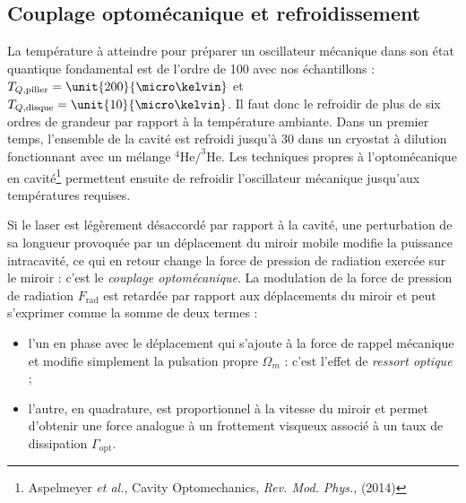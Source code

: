 \documentclass[12pt,a4paper]{article}
\begin{document}
\subsection{Couplage optomécanique et refroidissement}
\label{sec:optomechanics}

La température à atteindre pour préparer un oscillateur mécanique dans son état quantique fondamental est de l'ordre de \unit{100}{\micro\kelvin} avec nos échantillons : $T_{Q,\mathrm{pilier}} = \unit{200}{\micro\kelvin}$ et $T_{Q,\mathrm{disque}} = \unit{10}{\micro\kelvin}$.
Il faut donc le refroidir de plus de six ordres de grandeur par rapport à la température ambiante.
Dans un premier temps, l'ensemble de la cavité est refroidi jusqu'à \unit{30}{\milli\kelvin} dans un cryostat à dilution fonctionnant avec un mélange $\mathrm{^4He/^3He}$.
Les techniques propres à l'optomécanique en cavité\footnote{Aspelmeyer \textit{et al.}, Cavity Optomechanics, \textit{Rev. Mod. Phys.}, (2014)} permettent ensuite de refroidir l'oscillateur mécanique jusqu'aux températures requises.

Si le laser est légèrement désaccordé par rapport à la cavité, une perturbation de sa longueur provoquée par un déplacement du miroir mobile modifie la puissance intracavité, ce qui en retour change la force de pression de radiation exercée sur le miroir : c'est le \textit{couplage optomécanique}.
La modulation de la force de pression de radiation $F_\mathrm{rad}$ est retardée par rapport aux déplacements du miroir et peut s'exprimer comme la somme de deux termes :
\begin{itemize}
\item l'un en phase avec le déplacement qui s'ajoute à la force de rappel mécanique et modifie simplement la pulsation propre $\Omega_m$ : c'est l'effet de \textit{ressort optique} ;
\item l'autre, en quadrature, est proportionnel à la vitesse du miroir et permet d'obtenir une force analogue à un frottement visqueux associé à un taux de dissipation $\Gamma_\mathrm{opt}$.
\end{itemize}
\end{document}
